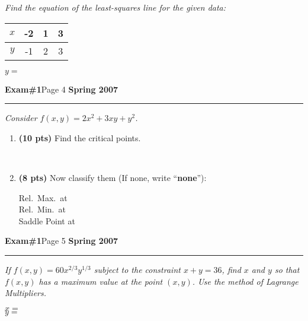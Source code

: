 \documentclass[12pt]{article}
\begin{document}
\bigskip
{\problem[12 pts] \em Find the equation of the least-squares line for
  the given data:}
\begin{center}
  \begin{tabular}{|c|c|c|c|}
    \hline $x$ & -2 & 1 & 3 \\
    \hline $y$ & -1 & 2 & 3 \\
    \hline
  \end{tabular}
\end{center}
\vspace{18cm}
  \begin{flushright}
    $y=$ \framebox[6cm]{\raisebox{1cm}[0.6cm][0.4cm]} 
  \end{flushright}
\newpage
\hfill{\large\bf Exam\#1}\hfill Page 4\hfill{\large\bf
  Spring 2007}\hrule 
\bigskip
{\problem \em Consider $f(x,y) = 2x^2 + 3xy + y^2$.}
\begin{enumerate}
\item {\bf (10 pts)} Find the critical points.
\vspace{7cm}
  \begin{flushright}
    \framebox[6cm]{\raisebox{1cm}[0.6cm][0.4cm]} \\
  \end{flushright}
\item {\bf (8 pts)} Now classify them (If none, write ``{\bf none}''):
\vspace{7cm}
  \begin{flushright}
    Rel.~Max.~at \framebox[6cm]{\raisebox{1cm}[0.6cm][0.4cm]} \\
    Rel.~Min.~at \framebox[6cm]{\raisebox{1cm}[0.6cm][0.4cm]} \\
    Saddle Point at \framebox[6cm]{\raisebox{1cm}[0.6cm][0.4cm]}
  \end{flushright}
\end{enumerate}
\newpage
\hfill{\large\bf Exam\#1}\hfill Page 5\hfill{\large\bf
  Spring 2007}\hrule

\bigskip
{\problem[16 pts] \em If $f(x,y) = 60x^{2/3} y^{1/3}$ subject to the
  constraint $x+y=36$, find $x$ and $y$ so that $f(x,y)$ has a maximum
value at the point $(x,y)$. Use the method of Lagrange Multipliers.}
\vspace{18cm}
\begin{flushright}
  $x=$ \framebox[6cm]{\raisebox{1cm}[0.6cm][0.4cm]} \\
  $y=$ \framebox[6cm]{\raisebox{1cm}[0.6cm][0.4cm]}
\end{flushright}
\newpage
\end{document}
